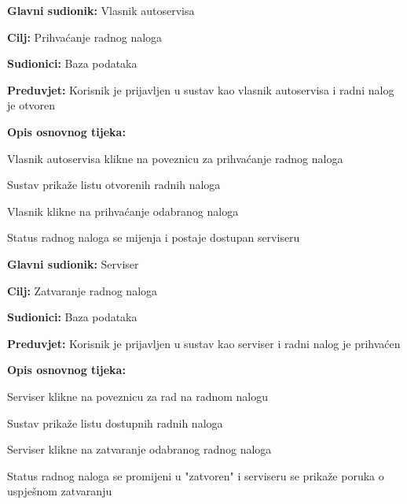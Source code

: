 \noindent {}
\begin{packed_item}
	
	\item \textbf{Glavni sudionik: } Vlasnik autoservisa
	\item  \textbf{Cilj:} Prihvaćanje radnog naloga
	\item  \textbf{Sudionici:} Baza podataka
	\item  \textbf{Preduvjet:} Korisnik je prijavljen u sustav kao vlasnik autoservisa i radni nalog
	je otvoren
	\item  \textbf{Opis osnovnog tijeka:}
	
	\item[] \begin{packed_enum}
		
		\item Vlasnik autoservisa klikne na poveznicu za prihvaćanje radnog naloga
		\item Sustav prikaže listu otvorenih radnih naloga
		\item Vlasnik klikne na prihvaćanje odabranog naloga
		\item Status radnog naloga se mijenja i postaje dostupan serviseru
		
	\end{packed_enum}
\end{packed_item}

\noindent {}
\begin{packed_item}
	
	\item \textbf{Glavni sudionik: } Serviser
	\item  \textbf{Cilj:} Zatvaranje radnog naloga
	\item  \textbf{Sudionici:} Baza podataka
	\item  \textbf{Preduvjet:} Korisnik je prijavljen u sustav kao serviser i radni nalog
	je prihvaćen
	\item  \textbf{Opis osnovnog tijeka:}
	
	\item[] \begin{packed_enum}
		
		\item Serviser klikne na poveznicu za rad na radnom nalogu
		\item Sustav prikaže listu dostupnih radnih naloga
		\item Serviser klikne na zatvaranje odabranog radnog naloga
		\item Status radnog naloga se promijeni u "zatvoren" i serviseru se prikaže poruka o uspješnom zatvaranju
		
	\end{packed_enum}
\end{packed_item}

